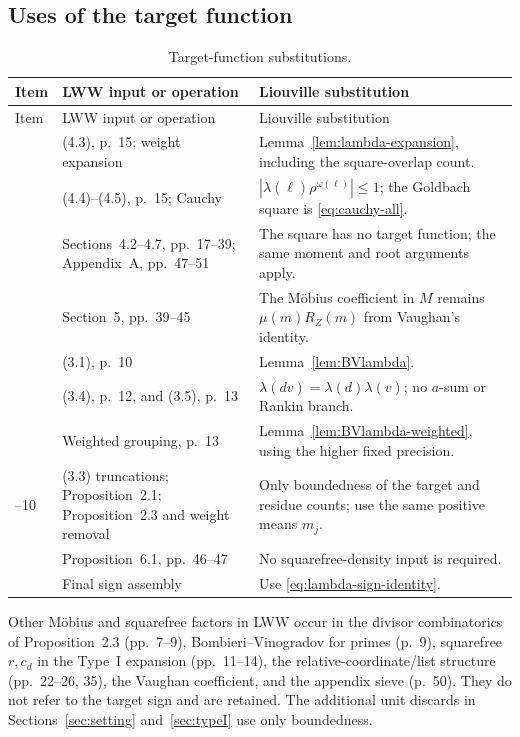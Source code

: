 \documentclass[11pt]{article}
\theoremstyle{definition}
\theoremstyle{remark}
\numberwithin{equation}{section}
\begin{document}
\subsection{Uses of the target function}\label{subsec:lambda-inventory}
\begin{center}
\small
\begin{longtable}{@{}>{\raggedright\arraybackslash}p{}>{\raggedright\arraybackslash}p{}>{\raggedright\arraybackslash}p{}@{}}
\caption{Target-function substitutions.}\label{tab:lambda-inventory}\\
\toprule
Item&LWW input or operation&Liouville substitution\\\midrule
\endfirsthead
\toprule Item&LWW input or operation&Liouville substitution\\\midrule
\endhead
1&(4.3), p.~15; weight expansion&Lemma~\ref{lem:lambda-expansion}, including the square-overlap count.\\
2&(4.4)--(4.5), p.~15; Cauchy&$|\lambda(\ell)\rho^{\omega(\ell)}|\le1$; the Goldbach square is \eqref{eq:cauchy-all}.\\
3&Sections~4.2--4.7, pp.~17--39; Appendix~A, pp.~47--51&The square has no target function; the same moment and root arguments apply.\\
4&Section~5, pp.~39--45&The M\"obius coefficient in $M$ remains $\mu(m)R_Z(m)$ from Vaughan's identity.\\
5&(3.1), p.~10&Lemma~\ref{lem:BVlambda}.\\
6&(3.4), p.~12, and (3.5), p.~13&$\lambda(dv)=\lambda(d)\lambda(v)$; no $a$-sum or Rankin branch.\\
7&Weighted grouping, p.~13&Lemma~\ref{lem:BVlambda-weighted}, using the higher fixed precision.\\
8--10&(3.3) truncations; Proposition~2.1; Proposition~2.3 and weight removal&Only boundedness of the target and residue counts; use the same positive means $m_j$.\\
11&Proposition~6.1, pp.~46--47&No squarefree-density input is required.\\
12&Final sign assembly&Use \eqref{eq:lambda-sign-identity}.\\
\bottomrule
\end{longtable}
\end{center}
Other M\"obius and squarefree factors in LWW occur in the divisor
combinatorics of Proposition~2.3 (pp.~7--9), Bombieri--Vinogradov
for primes (p.~9), squarefree $r,c_d$ in the Type~I expansion
(pp.~11--14), the relative-coordinate/list structure (pp.~22--26,
35), the Vaughan coefficient, and the appendix sieve (p.~50).
They do not refer to the target sign and are retained.
The additional unit discards in Sections~\ref{sec:setting}
and~\ref{sec:typeI} use only boundedness.
\end{document}
